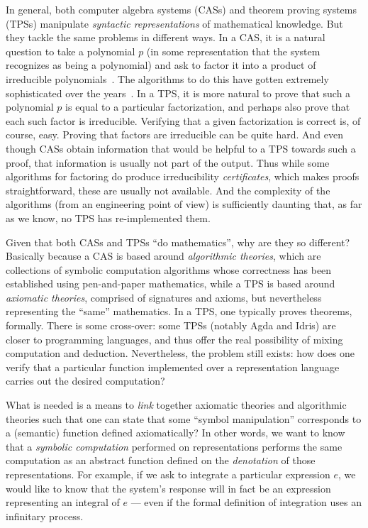 \documentclass[fleqn]{llncs}
\begin{document}
In general, both computer algebra systems (CASs) and theorem proving
systems (TPSs) manipulate \emph{syntactic representations} of
mathematical knowledge.  But they tackle the same problems in
different ways. In a CAS, it is a natural question to take a
polynomial $p$ (in some representation that the system recognizes as
being a polynomial) and ask to factor it into a product of
irreducible polynomials~\cite{von2003modern}.  The algorithms to do
this have gotten extremely sophisticated over the
years~\cite{vanhoeij2002}.  In a TPS, it is more natural to prove that
such a polynomial $p$ is equal to a particular factorization, and
perhaps also prove that each such factor is irreducible. Verifying
that a given factorization is correct is, of course, easy. Proving
that factors are irreducible can be quite hard. And even though
CASs obtain
information that would be helpful to a TPS towards such a proof, that
information is usually not part of the output. Thus while some
algorithms for factoring do produce irreducibility
\emph{certificates}, which makes proofs straightforward, these are
usually not available. And the complexity of the algorithms (from an
engineering point of view) is sufficiently daunting that, as far as we
know, no TPS has re-implemented them.

Given that both CASs and TPSs ``do mathematics'', why are they so 
different? Basically because a CAS is based around
\emph{algorithmic theories}, which are collections of symbolic computation
algorithms whose correctness has been established using pen-and-paper
mathematics, while a TPS is based around \emph{axiomatic theories},
comprised of signatures and axioms, but nevertheless representing the
``same'' mathematics. In a TPS, one typically proves theorems, formally.
There is some cross-over: some TPSs (notably Agda and Idris) are closer
to programming languages, and thus offer the real possibility of mixing
computation and deduction. Nevertheless, the problem still exists: how
does one verify that a particular function implemented over a representation
language carries out the desired computation?

What is needed is a means to \emph{link} together axiomatic theories
and algorithmic theories such that one can state that some ``symbol
manipulation'' corresponds to a (semantic) function defined axiomatically?
In other words, we want to know that a \emph{symbolic computation}
performed on representations performs the same computation as an abstract
function defined on the \emph{denotation} of those representations.
For example, if we ask to integrate a particular expression $e$, we would like
to know that the system's response will in fact be an expression representing
an integral of $e$ --- even if the formal definition of integration uses an
infinitary process.
\end{document}
